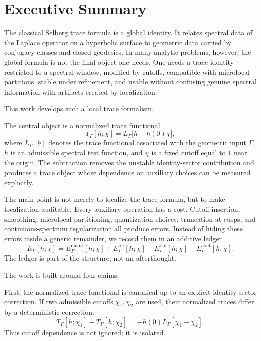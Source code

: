 
\chapter*{Executive Summary}

The classical Selberg trace formula is a global identity.  It relates spectral data of the Laplace operator on a hyperbolic surface to geometric data carried by conjugacy classes and closed geodesics.  In many analytic problems, however, the global formula is not the final object one needs.  One needs a trace identity restricted to a spectral window, modified by cutoffs, compatible with microlocal partitions, stable under refinement, and usable without confusing genuine spectral information with artifacts created by localization.

This work develops such a local trace formalism.

The central object is a normalized trace functional
\[
  T_\Gamma[h;\chi]
  =
  L_\Gamma\big[h-h(0)\chi\big],
\]
where \(L_\Gamma[h]\) denotes the trace functional associated with the geometric input \(\Gamma\), \(h\) is an admissible spectral test function, and \(\chi\) is a fixed cutoff equal to \(1\) near the origin.  The subtraction removes the unstable identity-sector contribution and produces a trace object whose dependence on auxiliary choices can be measured explicitly.

The main point is not merely to localize the trace formula, but to make localization auditable.  Every auxiliary operation has a cost.  Cutoff insertion, smoothing, microlocal partitioning, quantization choices, truncation at cusps, and continuous-spectrum regularization all produce errors.  Instead of hiding these errors inside a generic remainder, we record them in an additive ledger
\[
  E_\Gamma[h;\chi]
  =
  E_\Gamma^{\mathrm{quant}}[h;\chi]
  +
  E_\Gamma^{\mathrm{ref}}[h;\chi]
  +
  E_\Gamma^{\mathrm{tail}}[h;\chi]
  +
  E_\Gamma^{\mathrm{cont}}[h;\chi].
\]
The ledger is part of the structure, not an afterthought.

The work is built around four claims.

First, the normalized trace functional is canonical up to an explicit identity-sector correction.  If two admissible cutoffs \(\chi_1,\chi_2\) are used, their normalized traces differ by a deterministic correction:
\[
  T_\Gamma[h;\chi_1]-T_\Gamma[h;\chi_2]
  =
  -h(0)L_\Gamma[\chi_1-\chi_2].
\]
Thus cutoff dependence is not ignored; it is isolated.

